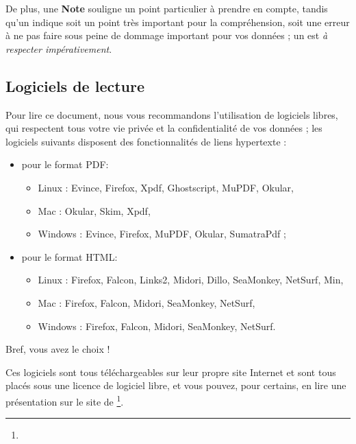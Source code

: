 De plus, une \textbf{Note} souligne un point particulier à prendre en compte, tandis qu'un \textcolor{red}{} indique soit un point très important pour la compréhension, soit une erreur à ne pas faire sous peine de dommage important pour vos données ; un \textcolor{red}{} est \emph{à respecter impérativement}.


\subsection{Logiciels de lecture\label{introduction-manual-readers}}

Pour lire ce document, nous vous recommandons l'utilisation de logiciels libres, qui respectent tous votre vie privée et la confidentialité de vos données ; les logiciels suivants disposent des fonctionnalités de \gls{liens hypertexte} : 
\begin{itemize}
	\item pour le format \gls{PDF}: 
		\begin{itemize}
				\item Linux : Evince, Firefox, Xpdf, Ghostscript, MuPDF, Okular,
				\item Mac : Okular, Skim, Xpdf,
				\item Windows : Evince, Firefox, MuPDF, Okular, SumatraPdf ;
		\end{itemize}
	\item pour le format \gls{HTML}:
		\begin{itemize}
				\item Linux : Firefox, Falcon, Links2, Midori, Dillo, SeaMonkey, NetSurf, Min,
				\item Mac : Firefox, Falcon, Midori, SeaMonkey, NetSurf,
				\item Windows : Firefox, Falcon, Midori, SeaMonkey, NetSurf.
		\end{itemize}
\end{itemize}

Bref, vous avez le choix !

Ces logiciels sont tous téléchargeables sur leur propre site Internet et sont tous placés sous une licence de \gls{logiciel libre}, et vous pouvez, pour certains, en lire une présentation sur le site de \footnote{\urlFramasoftLogiciels{}}.
